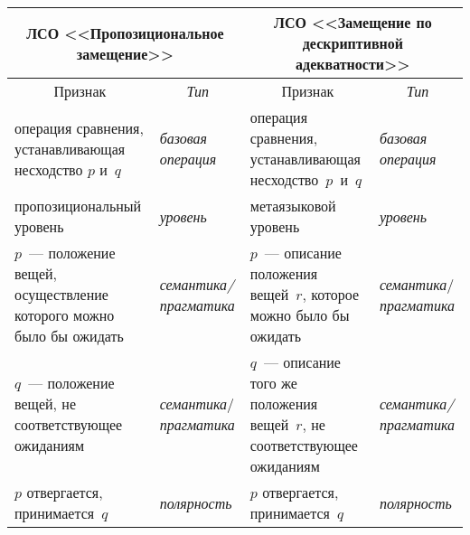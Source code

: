 \begin{multicols}{2}
\begin{table*}
\begin{center}
\tabcolsep=5pt
\begin{tabular}{|p{48mm}|p{28mm}|p{48mm}|p{28mm}|}
\hline
\multicolumn{2}{|c|}{\textbf{ЛСО <<Пропозициональное 
замещение>>}}&\multicolumn{2}{c|}{\textbf{ЛСО <<Замещение по дескриптивной 
адекватности>>}}\\
\hline
\multicolumn{1}{|c|}{Признак}&\multicolumn{1}{c|}{\textit{Тип}}&
\multicolumn{1}{c|}{Признак}&\multicolumn{1}{c|}{\textit{Тип}}\\
\hline
операция сравнения, уста\-нав\-ли\-ва\-ющая несходство $p$ и~$q$&\textit{базовая операция}&
операция сравнения, уста\-нав\-ли\-ва\-ющая несходство~$p$~и~$q$&\textit{базовая операция}\\
\hline
пропозициональный уровень&\textit{уровень}&
метаязыковой уровень&\textit{уровень}\\
\hline
$p$~--- положение вещей, осу\-ще\-ст\-в\-ле\-ние которого можно было бы ожидать&\textit{се\-ман\-ти\-ка/праг\-ма\-ти\-ка}&
$p$~--- описание положения вещей~$r$, которое можно 
было бы ожидать&\textit{семантика}/\textit{праг\-ма\-ти\-ка}\\
\hline
$q$~--- положение вещей, не со\-от\-вет\-ст\-ву\-ющее ожиданиям &\textit{семантика}/\textit{праг\-ма\-ти\-ка}&
$q$~--- описание того же положения вещей~$r$, не со\-от\-вет\-ст\-ву\-ющее 
ожиданиям&\textit{се\-ман\-ти\-ка/праг\-ма\-ти\-ка}\\
\hline
$p$ отвергается, принимается~$q$&\textit{полярность}&
$p$ отвергается, принимается~$q$&\textit{полярность}\\
\hline
\end{tabular}
\end{center}

\end{table*}
   

\end{multicols}
